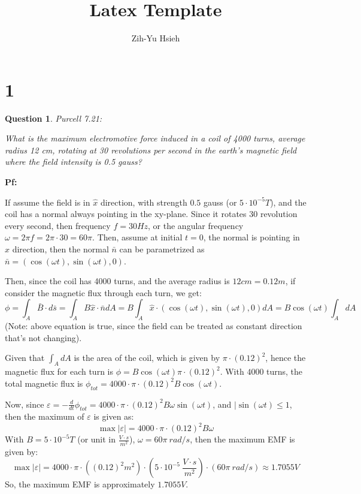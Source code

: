 \documentclass{article}
\title{Latex Template}
\author{Zih-Yu Hsieh}
\newtheorem{question}{Question}
\begin{document}
\maketitle

\section*{1}
\begin{myBox}[]{}
    \begin{question}
        Purcell 7.21:

        What is the maximum electromotive force induced in a coil of
        4000 turns, average radius 12 cm, rotating at 30 revolutions per
        second in the earth’s magnetic field where the field intensity is
        0.5 gauss?
    \end{question}
\end{myBox}

\textbf{Pf:}

If assume the field is in $\hat{x}$ direction, with strength $0.5$ gauss (or $5\cdot 10^{-5} T$), and the coil has a normal always pointing in the xy-plane.
Since it rotates 30 revolution every second, then frequency $f=30 Hz$, or the angular frequency $\omega = 2\pi f = 2\pi \cdot 30 = 60\pi$.
Then, assume at initial $t=0$, the normal is pointing in $\hat{x}$ direction, then the normal $\bar{n}$ can be parametrized as $\bar{n}=(\cos(\omega t),\sin (\omega t),0)$.

\hfill

Then, since the coil has 4000 turns, and the average radius is $12 cm = 0.12 m$, if consider the magnetic flux through each turn, we get:
$$\phi = \int_A\bar{B}\cdot d\bar{s} = \int_A B\hat{x} \cdot\bar{n} dA = B\int_A\hat{x}\cdot (\cos(\omega t),\sin(\omega t),0)dA = B\cos(\omega t)\int_AdA$$
(Note: above equation is true, since the field can be treated as constant direction that's not changing).

Given that $\int_A dA$ is the area of the coil, which is given by $\pi \cdot (0.12)^2$, hence the magnetic flux for each turn is $\phi = B\cos(\omega t)\pi \cdot (0.12)^2$.
With $4000$ turns, the total magnetic flux is $\phi_{tot}=4000 \cdot \pi \cdot (0.12)^2 B\cos(\omega t)$.

\hfill

Now, since $\varepsilon=-\frac{d}{dt}\phi_{tot} = 4000\cdot\pi\cdot(0.12)^2B\omega\sin(\omega t)$, and $|\sin(\omega t)\leq 1$, then the maximum of $\varepsilon$ is given as:
$$\max|\varepsilon| =4000\cdot \pi \cdot (0.12)^2 B\omega $$
With $B=5\cdot 10^{-5}T$ (or unit in $\frac{V\cdot s}{m^2}$), $\omega = 60\pi\ rad/s$, then the maximum EMF is given by:
$$\max|\varepsilon| = 4000\cdot\pi\cdot((0.12)^2m^2)\cdot \left(5\cdot 10^{-5}\ \frac{V\cdot s}{m^2}\right)\cdot (60\pi\ rad/s) \approx 1.7055 V$$
So, the maximum EMF is approximately $1.7055 V$.
\end{document}
